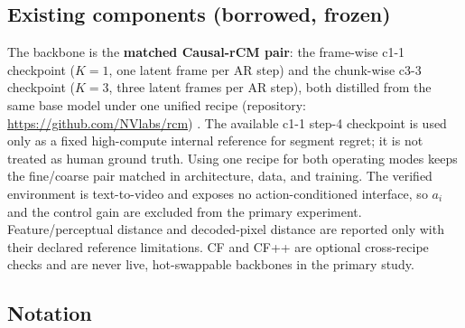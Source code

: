 \documentclass[11pt,a4paper]{article}
\begin{document}
\subsection{Existing components (borrowed, frozen)}

The backbone is the \textbf{matched Causal-rCM pair}: the frame-wise c1-1 checkpoint ($K=1$, one latent frame per AR step) and the chunk-wise c3-3 checkpoint ($K=3$, three latent frames per AR step), both distilled from the same base model under one unified recipe (repository: \url{https://github.com/NVlabs/rcm}) \parencite{zhengCausalrCMUnifiedTeacherForcing2026}. The available c1-1 step-4 checkpoint is used only as a fixed high-compute internal reference for segment regret; it is not treated as human ground truth. Using one recipe for both operating modes keeps the fine/coarse pair matched in architecture, data, and training. The verified environment is text-to-video and exposes no action-conditioned interface, so $a_i$ and the control gain are excluded from the primary experiment. Feature/perceptual distance and decoded-pixel distance are reported only with their declared reference limitations. CF and CF++ are optional cross-recipe checks and are never live, hot-swappable backbones in the primary study.

\subsection{Notation}
\end{document}
